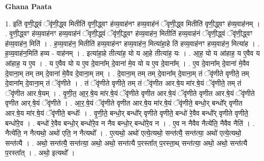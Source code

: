 \documentclass[17pt]{extarticle}
\begin{document}
\textbf{Ghana Paata } \newline

1. इति॑ वृणी॒द्ध्वं ॅवृ॑णी॒द्ध्व मितीति॑ वृणी॒द्ध्वꣳ ह॑व्य॒वाह॑नꣳ हव्य॒वाह॑नं ॅवृणी॒द्ध्व मितीति॑ वृणी॒द्ध्वꣳ ह॑व्य॒वाह॑नम् । . वृ॒णी॒द्ध्वꣳ ह॑व्य॒वाह॑नꣳ हव्य॒वाह॑नं ॅवृणी॒द्ध्वं ॅवृ॑णी॒द्ध्वꣳ ह॑व्य॒वाह॑न॒ मितीति॑ हव्य॒वाह॑नं ॅवृणी॒द्ध्वं ॅवृ॑णी॒द्ध्वꣳ ह॑व्य॒वाह॑न॒ मिति॑ । . ह॒व्य॒वाह॑न॒ मितीति॑ हव्य॒वाह॑नꣳ हव्य॒वाह॑न॒ मित्या॑हा॒हे ति॑ हव्य॒वाह॑नꣳ हव्य॒वाह॑न॒ मित्या॑ह । . ह॒व्य॒वाह॑न॒मिति॑ हव्य - वाह॑नम् । . इत्या॑हा॒हे तीत्या॑ह॒ यो य आ॒हे तीत्या॑ह॒ यः । . आ॒ह॒ यो य आ॑हाह॒ य ए॒वैव य आ॑हाह॒ य ए॒व । . य ए॒वैव यो य ए॒व दे॒वाना᳚म् दे॒वाना॑ मे॒व यो य ए॒व दे॒वाना᳚म् । . ए॒व दे॒वाना᳚म् दे॒वाना॑ मे॒वैव दे॒वाना॒म् तम् तम् दे॒वाना॑ मे॒वैव दे॒वाना॒म् तम् । . दे॒वाना॒म् तम् तम् दे॒वाना᳚म् दे॒वाना॒म् तं ॅवृ॑णीते वृणीते॒ तम् दे॒वाना᳚म् दे॒वाना॒म् तं ॅवृ॑णीते । . तं ॅवृ॑णीते वृणीते॒ तम् तं ॅवृ॑णीत आर.षे॒य मा॑र.षे॒यं ॅवृ॑णीते॒ तम् तं ॅवृ॑णीत आर.षे॒यम् । . वृ॒णी॒त॒ आ॒र॒.षे॒य मा॑र.षे॒यं ॅवृ॑णीते वृणीत आर.षे॒यं ॅवृ॑णीते वृणीत आर.षे॒यं ॅवृ॑णीते वृणीत आर्.षे॒यं ॅवृ॑णीते । . आ॒र॒.षे॒यं ॅवृ॑णीते वृणीत आर.षे॒य मा॑र.षे॒यं ॅवृ॑णीते॒ बन्धो॒र् बन्धो᳚र् वृणीत आर.षे॒य मा॑र.षे॒यं ॅवृ॑णीते॒ बन्धोः᳚ । . वृ॒णी॒ते॒ बन्धो॒र् बन्धो᳚र् वृणीते वृणीते॒ बन्धो॑ रे॒वैव बन्धो᳚र् वृणीते वृणीते॒ बन्धो॑रे॒व । . बन्धो॑ रे॒वैव बन्धो॒र् बन्धो॑रे॒व न नैव बन्धो॒र् बन्धो॑रे॒व न । . ए॒व न नैवैव नैत्ये॑ति॒ नैवैव नैति॑ । . नैत्ये॑ति॒ न नैत्यथो॒ अथो॑ एति॒ न नैत्यथो᳚ । . ए॒त्यथो॒ अथो॑ एत्ये॒त्यथो॒ सन्त॑त्यै॒ सन्त॑त्या॒ अथो॑ एत्ये॒त्यथो॒ सन्त॑त्यै । . अथो॒ सन्त॑त्यै॒ सन्त॑त्या॒ अथो॒ अथो॒ सन्त॑त्यै प॒रस्ता᳚त् प॒रस्ता॒थ् सन्त॑त्या॒ अथो॒ अथो॒ सन्त॑त्यै प॒रस्ता᳚त् । . अथो॒ इत्यथो᳚ । \newline
\end{document}

